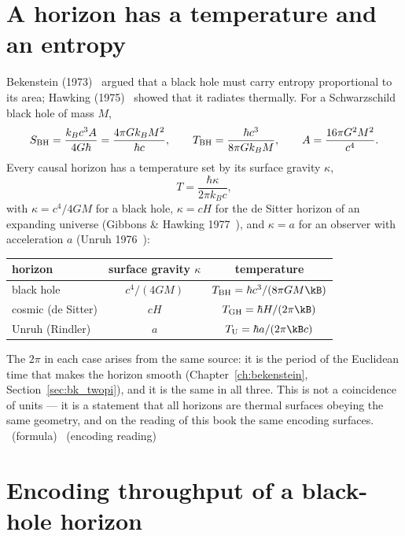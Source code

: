 \section{A horizon has a temperature and an entropy}\label{sec:bh_thermo}
Bekenstein (1973)~\cite{Bekenstein1973} argued that a black hole must carry entropy proportional to its area; Hawking (1975)~\cite{Hawking1975} showed that it radiates thermally. For a
Schwarzschild black hole of mass $M$,
\begin{equation}
S_{\rm BH}=\frac{k_Bc^3A}{4G\hbar}=\frac{4\pi Gk_BM^2}{\hbar c},\qquad T_{\rm BH}=\frac{\hbar c^3}{8\pi Gk_BM},\qquad A=\frac{16\pi G^2M^2}{c^4}.
\end{equation}
Every causal horizon has a temperature set by its surface gravity $\kappa$,
\begin{equation}
T=\frac{\hbar\kappa}{2\pi k_Bc},\label{eq:bh_Tuniv}
\end{equation}
with $\kappa=c^4/4GM$ for a black hole, $\kappa=cH$ for the de Sitter horizon of an expanding universe (Gibbons \& Hawking 1977~\cite{GibbonsHawking1977}), and $\kappa=a$ for an
observer with acceleration $a$ (Unruh 1976~\cite{Unruh1976}):
\begin{center}\small\begin{tabular}{lcc}\toprule
horizon & surface gravity $\kappa$ & temperature\\\midrule
black hole & $c^4/(4GM)$ & $T_{\rm BH}=\hbar c^3/(8\pi GM\kB)$\\
cosmic (de Sitter) & $cH$ & $T_{\rm GH}=\hbar H/(2\pi\kB)$\\
Unruh (Rindler) & $a$ & $T_{\rm U}=\hbar a/(2\pi\kB c)$\\\bottomrule
\end{tabular}\end{center}
The $2\pi$ in each case arises from the same source: it is the period of the Euclidean time that makes the horizon smooth (Chapter~\ref{ch:bekenstein},
Section~\ref{sec:bk_twopi}), and it is the same in all three. This is not a coincidence of units --- it is a statement that all horizons are thermal surfaces
obeying the same geometry, and on the reading of this book the same encoding surfaces. \derived\ (formula) \interp\ (encoding reading)

\section{Encoding throughput of a black-hole horizon}\label{sec:bh_throughput}
